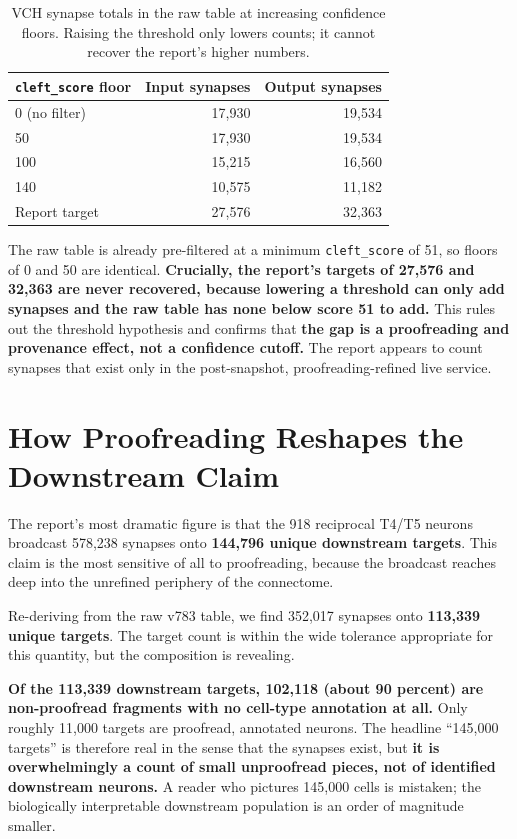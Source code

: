\documentclass[11pt]{article}
\newcommand{\key}[1]{\textbf{#1}}
\begin{document}
\begin{table}[H]
\centering
\caption{VCH synapse totals in the raw table at increasing confidence floors. Raising the
threshold only lowers counts; it cannot recover the report's higher numbers.}
\label{tab:sweep}
\begin{tabular}{lrr}
\toprule
\texttt{cleft\_score} floor & Input synapses & Output synapses \\
\midrule
0 (no filter)   & 17{,}930 & 19{,}534 \\
50              & 17{,}930 & 19{,}534 \\
100             & 15{,}215 & 16{,}560 \\
140             & 10{,}575 & 11{,}182 \\
\midrule
Report target   & 27{,}576 & 32{,}363 \\
\bottomrule
\end{tabular}
\end{table}

The raw table is already pre-filtered at a minimum \texttt{cleft\_score} of 51, so
floors of 0 and 50 are identical. \key{Crucially, the report's targets of 27{,}576 and
32{,}363 are never recovered, because lowering a threshold can only add synapses and the
raw table has none below score 51 to add.} This rules out the threshold hypothesis and
confirms that \key{the gap is a proofreading and provenance effect, not a confidence
cutoff.} The report appears to count synapses that exist only in the post-snapshot,
proofreading-refined live service.

\section{How Proofreading Reshapes the Downstream Claim}

The report's most dramatic figure is that the 918 reciprocal T4/T5 neurons broadcast
578{,}238 synapses onto \key{144{,}796 unique downstream targets}. This claim is the most
sensitive of all to proofreading, because the broadcast reaches deep into the unrefined
periphery of the connectome.

Re-deriving from the raw v783 table, we find 352{,}017 synapses onto \key{113{,}339
unique targets}. The target count is within the wide tolerance appropriate for this
quantity, but the composition is revealing.

\key{Of the 113{,}339 downstream targets, 102{,}118 (about 90 percent) are non-proofread
fragments with no cell-type annotation at all.} Only roughly 11{,}000 targets are
proofread, annotated neurons. The headline ``145{,}000 targets'' is therefore real in the
sense that the synapses exist, but \key{it is overwhelmingly a count of small unproofread
pieces, not of identified downstream neurons.} A reader who pictures 145{,}000 cells is
mistaken; the biologically interpretable downstream population is an order of magnitude
smaller.
\end{document}
